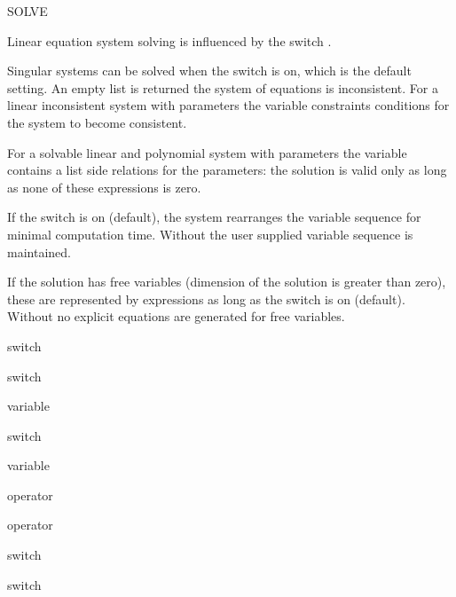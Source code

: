 \begin{Operator}{SOLVE}
\begin{Comments}
Linear equation system solving is influenced by the switch .

Singular systems can be solved when the switch  is
on, which is the default setting.  An empty list is returned the system of
equations is inconsistent. For a linear inconsistent system with parameters
the variable  constraints
conditions for the system to become consistent.

For a solvable linear and polynomial system with parameters 
the variable 
contains a list side relations for the parameters: the solution is
valid only as long as none of these expressions is zero.

If the switch  is on (default), the system rearranges the 
variable sequence for minimal computation time. Without  
the user supplied variable sequence is maintained.

If the solution has free variables (dimension of the solution is greater
than zero), these are represented by  expressions 
as long as the switch  is on (default). Without
 no explicit equations are generated for free variables.
\end{Comments}

\begin{Related}
\item[\nameref{allbranch} switch]
\item[\nameref{arbvars} switch]
\item[\nameref{assumptions} variable]
\item[\nameref{fullroots} switch]
\item[\nameref{requirements} variable]
\item[\nameref{roots} operator]
\item[\nameref{root\_of} operator]
\item[\nameref{trigform} switch]
\item[\nameref{varopt} switch]
\end{Related}

\end{Operator}

